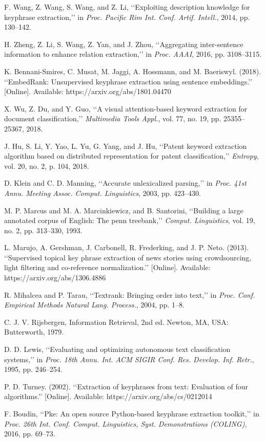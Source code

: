 \documentclass{ieeeaccess}
\begin{document}
\begin{thebibliography}{00}
F. Wang, Z. Wang, S. Wang, and Z. Li, ‘‘Exploiting description knowledge
for keyphrase extraction,’’ in \textit{Proc. Pacific Rim Int. Conf. Artif. Intell.},
2014, pp. 130–142.

H. Zheng, Z. Li, S. Wang, Z. Yan, and J. Zhou, ‘‘Aggregating inter-sentence
information to enhance relation extraction,’’ in \textit{Proc. AAAI}, 2016,
pp. 3108–3115.

K. Bennani-Smires, C. Musat, M. Jaggi, A. Hossmann, and M. Baeriswyl.
(2018). ‘‘EmbedRank: Unsupervised keyphrase extraction using sentence
embeddings.’’ [Online]. Available: https://arxiv.org/abs/1801.04470

X. Wu, Z. Du, and Y. Guo, ‘‘A visual attention-based keyword extraction
for document classification,’’ \textit{Multimedia Tools Appl.}, vol. 77, no. 19,
pp. 25355–25367, 2018.

J. Hu, S. Li, Y. Yao, L. Yu, G. Yang, and J. Hu, ‘‘Patent keyword extraction
algorithm based on distributed representation for patent classification,’’
\textit{Entropy}, vol. 20, no. 2, p. 104, 2018.

D. Klein and C. D. Manning, ‘‘Accurate unlexicalized parsing,’’ in \textit{Proc.
41st Annu. Meeting Assoc. Comput. Linguistics}, 2003, pp. 423–430.

M. P. Marcus and M. A. Marcinkiewicz, and B. Santorini, ‘‘Building a large
annotated corpus of English: The penn treebank,’’ \textit{Comput. Linguistics},
vol. 19, no. 2, pp. 313–330, 1993.

L. Marujo, A. Gershman, J. Carbonell, R. Frederking, and J. P. Neto.
(2013). ‘‘Supervised topical key phrase extraction of news stories using
crowdsourcing, light filtering and co-reference normalization.’’ [Online].
Available: https://arxiv.org/abs/1306.4886

R. Mihalcea and P. Tarau, ‘‘Textrank: Bringing order into text,’’ in \textit{Proc.
Conf. Empirical Methods Natural Lang. Process.}, 2004, pp. 1–8.

C. J. V. Rijsbergen, Information Retrieval, 2nd ed. Newton, MA, USA:
Butterworth, 1979.

D. D. Lewis, ‘‘Evaluating and optimizing autonomous text classification
systems,’’ in \textit{Proc. 18th Annu. Int. ACM SIGIR Conf. Res. Develop. Inf.
Retr.}, 1995, pp. 246–254.

P. D. Turney. (2002). ‘‘Extraction of keyphrases from text: Evaluation of
four algorithms.’’ [Online]. Available: https://arxiv.org/abs/cs/0212014

F. Boudin, ‘‘Pke: An open source Python-based keyphrase extraction
toolkit,’’ in \textit{Proc. 26th Int. Conf. Comput. Linguistics, Syst. Demonstrations
(COLING)}, 2016, pp. 69–73.

\end{thebibliography}
\end{document}
